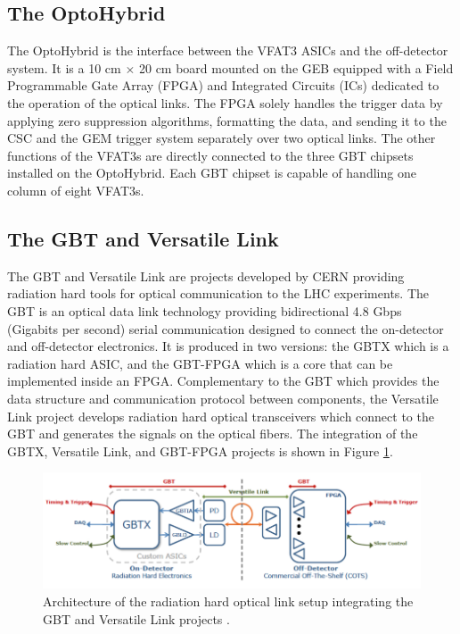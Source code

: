     \subsection{The OptoHybrid}

      The OptoHybrid is the interface between the VFAT3 ASICs and the off-detector system. It is a 10 cm $ \times $ 20 cm board mounted on the GEB equipped with a Field Programmable Gate Array (FPGA) and Integrated Circuits (ICs) dedicated to the operation of the optical links. The FPGA solely handles the trigger data by applying zero suppression algorithms, formatting the data, and sending it to the CSC and the GEM trigger system separately over two optical links. The other functions of the VFAT3s are directly connected to the three GBT chipsets installed on the OptoHybrid. Each GBT chipset is capable of handling one column of eight VFAT3s.

    \subsection{The GBT and Versatile Link}
    \label{sec:II-2-gbt}

      The GBT \cite{Moreira:1235836} and Versatile Link \cite{Soos:1609037} are projects developed by CERN providing radiation hard tools for optical communication to the LHC experiments. The GBT is an optical data link technology providing bidirectional 4.8 Gbps (Gigabits per second) serial communication designed to connect the on-detector and off-detector electronics. It is produced in two versions: the GBTX which is a radiation hard ASIC, and the GBT-FPGA which is a core that can be implemented inside an FPGA. Complementary to the GBT which provides the data structure and communication protocol between components, the Versatile Link project develops radiation hard optical transceivers which connect to the GBT and generates the signals on the optical fibers. The integration of the GBTX, Versatile Link, and GBT-FPGA projects is shown in Figure \ref{fig:II-2-gbt-versatile}. \\

      \begin{figure}[b!]
        \centering
        \includegraphics[width=\textwidth]{img/II-2-daq/gbt-versatile.pdf}
        \caption{Architecture of the radiation hard optical link setup integrating the GBT and Versatile Link projects \cite{Moreira:1235836}.}
        \label{fig:II-2-gbt-versatile}
      \end{figure}

